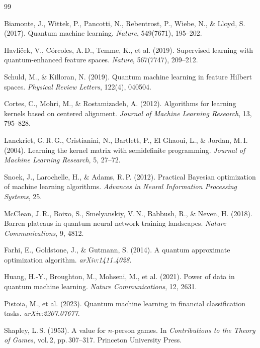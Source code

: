 \documentclass[12pt,a4paper]{article}
\begin{document}
\begin{thebibliography}{99}

Biamonte, J., Wittek, P., Pancotti, N., Rebentrost, P., Wiebe, N., \& Lloyd, S.
(2017).
Quantum machine learning.
\textit{Nature}, 549(7671), 195--202.

Havlíček, V., Córcoles, A.\,D., Temme, K., et al.
(2019).
Supervised learning with quantum-enhanced feature spaces.
\textit{Nature}, 567(7747), 209--212.

Schuld, M., \& Killoran, N.
(2019).
Quantum machine learning in feature Hilbert spaces.
\textit{Physical Review Letters}, 122(4), 040504.

Cortes, C., Mohri, M., \& Rostamizadeh, A.
(2012).
Algorithms for learning kernels based on centered alignment.
\textit{Journal of Machine Learning Research}, 13, 795--828.

Lanckriet, G.\,R.\,G., Cristianini, N., Bartlett, P., El Ghaoui, L.,
\& Jordan, M.\,I.
(2004).
Learning the kernel matrix with semidefinite programming.
\textit{Journal of Machine Learning Research}, 5, 27--72.

Snoek, J., Larochelle, H., \& Adams, R.\,P.
(2012).
Practical Bayesian optimization of machine learning algorithms.
\textit{Advances in Neural Information Processing Systems}, 25.

McClean, J.\,R., Boixo, S., Smelyanskiy, V.\,N., Babbush, R., \& Neven, H.
(2018).
Barren plateaus in quantum neural network training landscapes.
\textit{Nature Communications}, 9, 4812.

Farhi, E., Goldstone, J., \& Gutmann, S.
(2014).
A quantum approximate optimization algorithm.
\textit{arXiv:1411.4028}.

Huang, H.-Y., Broughton, M., Mohseni, M., et al.
(2021).
Power of data in quantum machine learning.
\textit{Nature Communications}, 12, 2631.

Pistoia, M., et al.
(2023).
Quantum machine learning in financial classification tasks.
\textit{arXiv:2207.07677}.

Shapley, L.\,S.
(1953).
A value for $n$-person games.
In \textit{Contributions to the Theory of Games}, vol.\,2, pp.\,307--317.
Princeton University Press.

\end{thebibliography}
\end{document}
